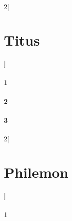 \documentclass{book}
\begin{document}
\begin{multicols}{2}[\part{Titus}]
\subsection*{1}
\subsection*{2}
\subsection*{3}
\end{multicols}
\begin{multicols}{2}[\part{Philemon}]
\subsection*{1}
\end{multicols}
\end{document}
